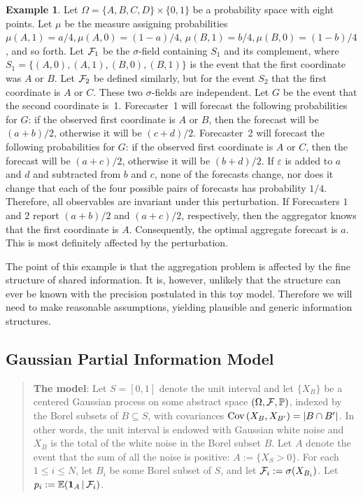 \documentclass[11pt]{article}
\renewcommand{\P}{\mathbb{P}}
\newcommand{\E}{\mathbb{E}}
\theoremstyle{definition}
\newtheorem{example}[theorem]{Example}
\theoremstyle{definition}
\def\one{{\bf 1}}
\def\F{{\cal F}}
\def\P{{\mathbb P}}
\def\E{{\mathbb E}}
\def\Cov{{\rm Cov}\,}
\def\ee{\varepsilon}
\def\|{\, | \,}
\begin{document}
\begin{example}
Let 
$\Omega = \{ A,B,C,D \} \times \{ 0,1 \}$ be a probability space 
with eight points.  Let $\mu$ be the measure assigning 
probabilities $\mu (A,1) = a/4, \mu (A,0) = (1-a)/4$, 
$\mu (B,1) = b/4, \mu (B,0) = (1-b)/4$, and so forth.
Let $\F_1$ be the $\sigma$-field containing $S_1$ and its complement, 
where $S_1 = \{ (A,0),(A,1),(B,0),(B,1) \}$ is the
event that the first coordinate was $A$ or $B$.  Let $\F_2$
be defined similarly, but for the event $S_2$ that the first coordinate
is $A$ or $C$.  These two $\sigma$-fields are independent.
Let $G$ be the event that the second coordinate is~1.
Forecaster~1 will forecast the following probabilities for $G$:
if the observed first coordinate is $A$ or $B$, then
the forecast will be $(a+b)/2$, otherwise it will be $(c+d)/2$.
Forecaster~2 will forecast the following probabilities for $G$:
if the observed first coordinate is $A$ or $C$, then
the forecast will be $(a+c)/2$, otherwise it will be $(b+d)/2$.
If $\ee$ is added to $a$ and $d$ and subtracted from $b$ and $c$,
none of the forecasts change, nor does it change that each of
the four possible pairs of forecasts has probability $1/4$.
Therefore, all observables are invariant under this perturbation.
If Forecasters $1$ and $2$ report $(a+b)/2$ and $(a+c)/2$, respectively, then the aggregator knows that
the first coordinate is $A$.  Consequently, the optimal aggregate forecast is $a$.  This is most definitely affected by the perturbation.  
\end{example}

The point of this example is that the aggregation problem is 
affected by the fine structure of shared information.  It is, however,
unlikely that the structure can ever be known with the precision
postulated in this toy model.  Therefore we will need to make
reasonable assumptions, yielding plausible and generic information
structures.

\subsection{Gaussian Partial Information Model}
\label{ss:Gaussian}

\begin{quote}
{\bf The model}: Let $S = [0,1]$ denote 
the unit interval and let $\{ X_B \}$ be a centered Gaussian process 
on some abstract space $(\Omega , \F , \P)$, indexed by the 
Borel subsets of $B \subseteq S$, with covariances $\Cov (X_B , X_{B'}) 
= |B \cap B'|$.  In other words, the unit interval is endowed
with Gaussian white noise and $X_B$ is the total of the white
noise in the Borel subset $B$.  Let $A$ denote the event that
the sum of all the noise is positive: $A := \{ X_S > 0 \}$.
For each $1 \leq i \leq N$, let $B_i$ be some Borel subset of $S$,
and let $\F_i := \sigma (X_{B_i})$.  Let $p_i := \E (\one_A \| \F_i)$.
\end{quote}
\end{document}
